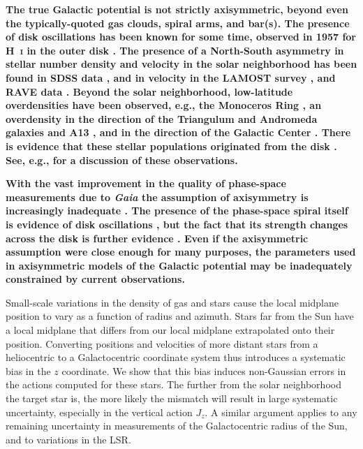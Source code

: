 \documentclass[twocolumn]{aastex62}
\begin{document}
\textbf{The true Galactic potential is not strictly axisymmetric, beyond even
the typically-quoted gas clouds, spiral arms, and bar(s). The presence of disk
oscillations has been known for some time, observed in 1957 for H~\textsc{i}
in the outer disk \citep{1957AJ.....62...93K}. The presence of a North-South
asymmetry in stellar number density and velocity in the solar neighborhood has
been found in SDSS data \citep{2012ApJ...750L..41W}, and in velocity in the
LAMOST survey \citep{2013ApJ...777L...5C}, and RAVE data
\citep{2013MNRAS.436..101W}. Beyond the solar neighborhood, low-latitude
overdensities have been observed, e.g., the Monoceros Ring
\citep{2002ApJ...569..245N, 2003MNRAS.340L..21I, 2003ApJ...594L.119C,
2014ApJ...791....9S, 2016ApJ...825..140M}, an overdensity in the direction of
the Triangulum and Andromeda galaxies \citep{2007ApJ...668L.123M,
2014ApJ...793...62S, 2015ApJ...801..105X, 2015MNRAS.452..676P} and A13
\citep{2010ApJ...722..750S, 2017ApJ...844...74L}, and in the direction of the
Galactic Center \citep{2014Natur.509..342F}. There is evidence that these
stellar populations originated from the disk \citep{2018ApJ...854...47S,
2018Natur.555..334B}. See, e.g., \citet{2018MNRAS.481..286L} for a discussion
of these observations.}

\textbf{With the vast improvement in the quality of phase-space measurements
due to \textit{Gaia} the assumption of axisymmetry is increasingly inadequate
\citep[e.g.,][]{2018Natur.561..360A, 2019MNRAS.485.3134L}. The presence of the
phase-space spiral itself is evidence of disk oscillations
\citep{2018Natur.561..360A}, but the fact that its strength changes across the
disk is further evidence \citep{2019MNRAS.486.1167B}. Even if the axisymmetric
assumption were close enough for many purposes, the parameters used in
axisymmetric models of the Galactic potential may be inadequately constrained
by current observations.}

Small-scale variations in the density of gas and stars cause the local
midplane position to vary as a function of radius and azimuth. Stars far from
the Sun have a local midplane that differs from our local midplane
extrapolated onto their position. Converting positions and velocities of more
distant stars from a heliocentric to a Galactocentric coordinate system thus
introduces a systematic bias in the $z$ coordinate. We show that this bias
induces non-Gaussian errors in the actions computed for these stars. The
further from the solar neighborhood the target star is, the more likely the
mismatch will result in large systematic uncertainty, especially in the
vertical action $J_z$. A similar argument applies to any remaining uncertainty
in measurements of the Galactocentric radius of the Sun, and to variations in
the LSR.
\end{document}
